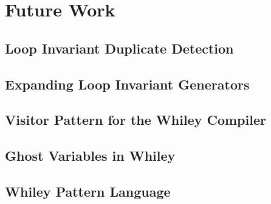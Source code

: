\chapter{Future Work}\label{C:future}

\section{Loop Invariant Duplicate Detection}

\section{Expanding Loop Invariant Generators}

\section{Visitor Pattern for the Whiley Compiler}

\section{Ghost Variables in Whiley}

\section{Whiley Pattern Language}

